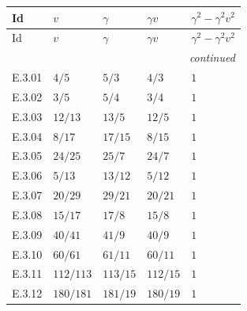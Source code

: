 {\small\setlength{\tabcolsep}{6pt}
\begin{longtable}{@{}lllll@{}}
\toprule
Id & $v$ & $\gamma$ & $\gamma v$ & $\gamma^2-\gamma^2v^2$ \\
\midrule\endfirsthead
\toprule
Id & $v$ & $\gamma$ & $\gamma v$ & $\gamma^2-\gamma^2v^2$ \\
\midrule\endhead
\midrule\multicolumn{5}{r}{\emph{continued}}\\\endfoot
\bottomrule\endlastfoot
E.3.01 & $4/5$ & $5/3$ & $4/3$ & $1$ \\
E.3.02 & $3/5$ & $5/4$ & $3/4$ & $1$ \\
E.3.03 & $12/13$ & $13/5$ & $12/5$ & $1$ \\
E.3.04 & $8/17$ & $17/15$ & $8/15$ & $1$ \\
E.3.05 & $24/25$ & $25/7$ & $24/7$ & $1$ \\
E.3.06 & $5/13$ & $13/12$ & $5/12$ & $1$ \\
E.3.07 & $20/29$ & $29/21$ & $20/21$ & $1$ \\
E.3.08 & $15/17$ & $17/8$ & $15/8$ & $1$ \\
E.3.09 & $40/41$ & $41/9$ & $40/9$ & $1$ \\
E.3.10 & $60/61$ & $61/11$ & $60/11$ & $1$ \\
E.3.11 & $112/113$ & $113/15$ & $112/15$ & $1$ \\
E.3.12 & $180/181$ & $181/19$ & $180/19$ & $1$ \\
\end{longtable}}
